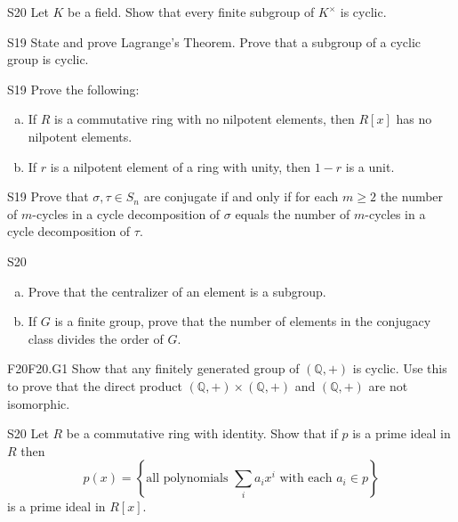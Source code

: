 \documentclass{article}
\newcommand{\Q}{\mathbb{Q}}
\theoremstyle{definition}
\begin{document}
	\begin{prob}{S20}{}
	Let $K$ be a field. Show that every finite subgroup of $K^\times$ is cyclic.
	\end{prob}

	\begin{prob}{S19}{}
	State and prove Lagrange's Theorem. Prove that a subgroup of a cyclic group is cyclic.
	\end{prob}

	\begin{prob}{S19}{}
	Prove the following:
	\begin{enumerate}[(a)]
	\item If $R$ is a commutative ring with no nilpotent elements, then $R[x]$ has no nilpotent elements.
	\item If $r$ is a nilpotent element of a ring with unity, then $1 - r$ is a unit.
	\end{enumerate}
	\end{prob}
	

	
	\begin{prob}{S19}{}
	Prove that $\sigma,\tau \in S_n$ are conjugate if and only if for each $m \geq 2$ the number of $m$-cycles in a cycle decomposition of $\sigma$ equals the number of $m$-cycles in a cycle decomposition of $\tau$.
	\end{prob}
	
	\begin{prob}{S20}{}
	\begin{enumerate}[(a)]
	\item Prove that the centralizer of an element is a subgroup.
	\item If $G$ is a finite group, prove that the number of elements in the conjugacy class divides the order of $G$.
	\end{enumerate}
	\end{prob}
	
	\begin{prob}{F20}{F20.G1}
	Show that any finitely generated group of $(\Q,+)$ is cyclic. Use this to prove that the direct product $(\Q,+) \times (\Q,+)$ and $(\Q,+)$ are not isomorphic.
	\end{prob}

	\begin{prob}{S20}{}
	Let $R$ be a commutative ring with identity. Show that if $p$ is a prime ideal in $R$ then
		\[p(x) = \left\{\textrm{all polynomials } \sum_i a_ix^i \textrm{ with each } a_i \in p \right\} \]
	is a prime ideal in $R[x]$.
	\end{prob}
	
\end{document}
